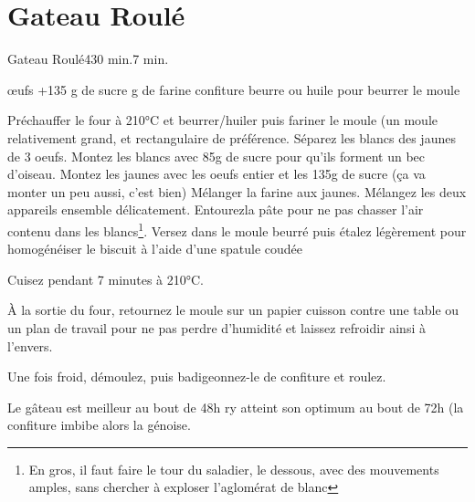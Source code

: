{%
\section{Gateau Roulé}
\begin{recette}{Gateau Roulé}{4}{30 min.}{7 min.}
\begin{ingredients}%
 œufs
+135 g de sucre
 g de farine
\ingredient confiture
\ingredient beurre ou huile pour beurrer le moule
\end{ingredients}

\begin{preparation}
\etape Préchauffer le four à 210°C et beurrer/huiler puis fariner le moule (un moule relativement grand, et rectangulaire de 
préférence.
\etape Séparez les blancs des jaunes de 3 oeufs. 
\etape Montez les  blancs avec 85g de sucre pour qu'ils forment un bec d'oiseau.
\etape Montez les jaunes avec les oeufs entier et les 135g de sucre (ça va monter un peu aussi, c'est bien)
\etape Mélanger la farine aux jaunes.
\etape Mélangez les deux appareils ensemble délicatement. \og Entourez\fg la pâte pour ne pas chasser l'air contenu dans les blancs\footnote{En gros, il faut faire le tour du 
saladier, le dessous, avec des mouvements amples, sans chercher à exploser l'aglomérat de blanc}.
\etape Versez dans le moule beurré puis étalez légèrement pour homogénéiser le biscuit à l'aide d'une spatule coudée
\end{preparation}

\begin{cuisson}
Cuisez pendant 7 minutes à 210°C.

À la sortie du four, retournez le moule sur un papier cuisson contre une table ou un plan de travail pour ne pas perdre d'humidité et laissez refroidir ainsi à l'envers.

Une fois froid, démoulez, puis badigeonnez-le de confiture et roulez.

\begin{remarque}
Le gâteau est meilleur au bout de 48h ry atteint son optimum au bout de 72h (la confiture imbibe alors la génoise.
\end{remarque}
\end{cuisson}
\end{recette}

}
